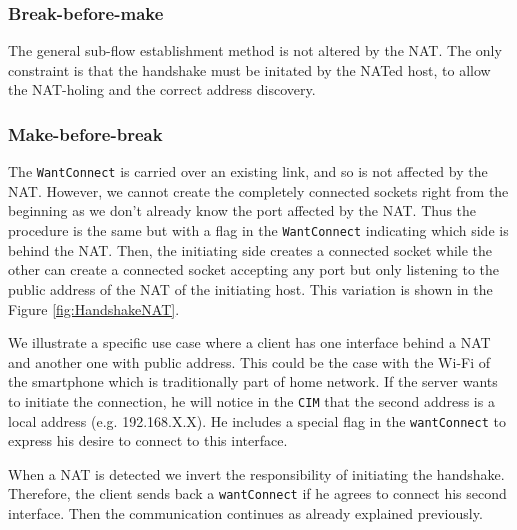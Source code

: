 \subsubsection{Break-before-make}
The general sub-flow establishment method is not altered by the NAT. The only constraint is that the handshake must be initated by the NATed host, to allow the NAT-holing and the correct address discovery.

\subsubsection{Make-before-break}
The \verb!WantConnect! is carried over an existing link, and so is not affected by the NAT. However, we cannot create the completely connected sockets right from the beginning as we don't already know the port affected by the NAT. Thus the procedure is the same but with a flag in the \verb!WantConnect! indicating which side is behind the NAT. Then, the initiating side creates a connected socket while the other can create a connected socket accepting any port but only listening to the public address of the NAT of the initiating host. This variation is shown in the Figure \ref{fig:HandshakeNAT}. 

We illustrate a specific use case where a client has one interface behind a NAT and another one with public address. This could be the case with the Wi-Fi of the smartphone which is traditionally part of home network. If the server wants to initiate the connection, he will notice in the \verb!CIM! that the second address is a local address (e.g. 192.168.X.X). He includes a special flag in the \verb!wantConnect! to express his desire to connect to this interface. 

When a NAT is detected we invert the responsibility of initiating the handshake. Therefore, the client sends back a \verb!wantConnect! if he agrees to connect his second interface. Then the communication continues as already explained previously.

